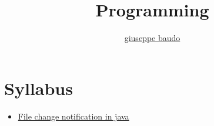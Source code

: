 \documentclass[a4paper,10pt]{article}
\title{Programming}
\author{\href{http://www.baudo.hol.es}{giuseppe baudo}}
\begin{document}
\maketitle

\section{Syllabus}
\begin{itemize}
 \item \href{FileChangeNotification.html}{File change notification in java}
\end{itemize}
\end{document}
